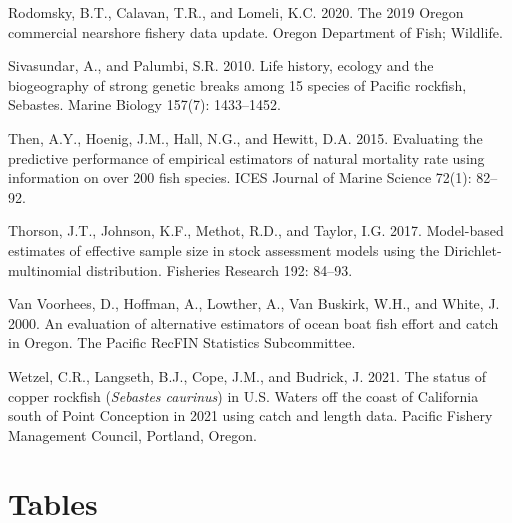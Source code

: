 \documentclass[11pt,
  english,
  a4paper,
]{article}
\newlength{\cslhangindent}
\newenvironment{CSLReferences}[2] %
 {%
  \setlength{\parindent}{0pt}
  \ifodd #1 \everypar{\setlength{\hangindent}{\cslhangindent}}\ignorespaces\fi
  \ifnum #2 > 0
  \setlength{\parskip}{#2\baselineskip}
  \fi
 }%
 {}
\begin{document}
\begin{CSLReferences}{1}{0}
\leavevmode{}%
Rodomsky, B.T., Calavan, T.R., and Lomeli, K.C. 2020. The 2019 {Oregon} commercial nearshore fishery data update. Oregon Department of Fish; Wildlife.

\leavevmode{}%
Sivasundar, A., and Palumbi, S.R. 2010. Life history, ecology and the biogeography of strong genetic breaks among 15 species of {Pacific} rockfish, {Sebastes}. Marine Biology 157(7): 1433--1452.

\leavevmode{}%
Then, A.Y., Hoenig, J.M., Hall, N.G., and Hewitt, D.A. 2015. Evaluating the predictive performance of empirical estimators of natural mortality rate using information on over 200 fish species. ICES Journal of Marine Science 72(1): 82--92.

\leavevmode{}%
Thorson, J.T., Johnson, K.F., Methot, R.D., and Taylor, I.G. 2017. Model-based estimates of effective sample size in stock assessment models using the {Dirichlet}-multinomial distribution. Fisheries Research 192: 84--93.

\leavevmode{}%
Van Voorhees, D., Hoffman, A., Lowther, A., Van Buskirk, W.H., and White, J. 2000. An evaluation of alternative estimators of ocean boat fish effort and catch in {Oregon}. The Pacific RecFIN Statistics Subcommittee.

\leavevmode{}%
Wetzel, C.R., Langseth, B.J., Cope, J.M., and Budrick, J. 2021. The status of copper rockfish (\emph{{Sebastes} caurinus}) in {U}.{S}. Waters off the coast of {California} south of {Point} {Conception} in 2021 using catch and length data. Pacific Fishery Management Council, Portland, Oregon.

\end{CSLReferences}

\leavevmode\tagmcend\tagstructend

\clearpage


\hypertarget{tables}{%
\section{Tables}\label{tables}}

\leavevmode\tagmcend\tagstructend
\end{document}
